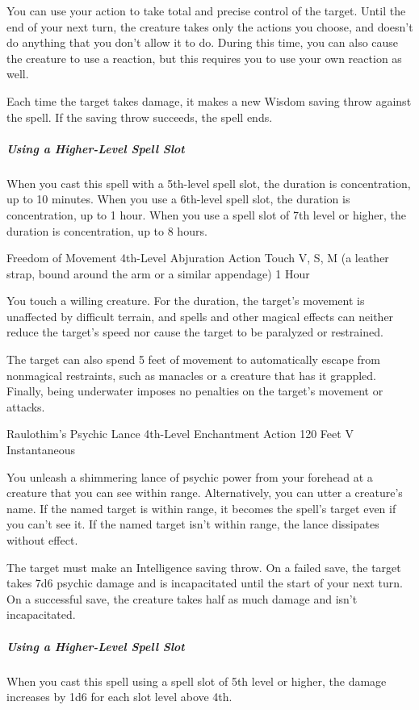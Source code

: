 \documentclass[letterpaper,openany,oneside,twocolumn]{book}
\begin{document}
You can use your action to take total and precise control of the target. Until the end of your next turn, the creature takes only the actions you choose, and doesn't do anything that you don't allow it to do. During this time, you can also cause the creature to use a reaction, but this requires you to use your own reaction as well.

Each time the target takes damage, it makes a new Wisdom saving throw against the spell. If the saving throw succeeds, the spell ends.

\subparagraph*{Using a Higher-Level Spell Slot} When you cast this spell with a 5th-level spell slot, the duration is concentration, up to 10 minutes. When you use a 6th-level spell slot, the duration is concentration, up to 1 hour. When you use a spell slot of 7th level or higher, the duration is concentration, up to 8 hours.

\DndSpellHeader
  {Freedom of Movement}
  {4th-Level Abjuration}
  {Action}
  {Touch}
  {V, S, M (a leather strap, bound around the arm or a similar appendage)}
  {1 Hour}
  
You touch a willing creature. For the duration, the target's movement is unaffected by difficult terrain, and spells and other magical effects can neither reduce the target's speed nor cause the target to be paralyzed or restrained.

The target can also spend 5 feet of movement to automatically escape from nonmagical restraints, such as manacles or a creature that has it grappled. Finally, being underwater imposes no penalties on the target's movement or attacks.

\DndSpellHeader
  {Raulothim's Psychic Lance}
  {4th-Level Enchantment}
  {Action}
  {120 Feet}
  {V}
  {Instantaneous}
  
You unleash a shimmering lance of psychic power from your forehead at a creature that you can see within range. Alternatively, you can utter a creature's name. If the named target is within range, it becomes the spell's target even if you can't see it. If the named target isn't within range, the lance dissipates without effect.

The target must make an Intelligence saving throw. On a failed save, the target takes 7d6 psychic damage and is incapacitated until the start of your next turn. On a successful save, the creature takes half as much damage and isn't incapacitated.

\subparagraph*{Using a Higher-Level Spell Slot} When you cast this spell using a spell slot of 5th level or higher, the damage increases by 1d6 for each slot level above 4th.
\end{document}
